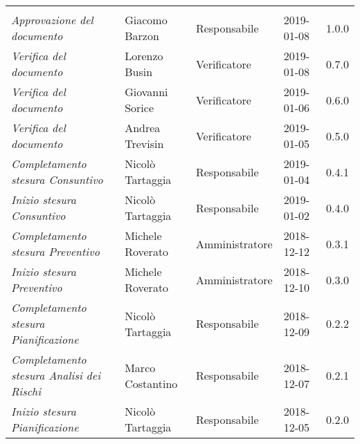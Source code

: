 \newpage 
\section*{}
\begin{table}[H]
	\centering
	\begin{tabular}{p{4cm}|C{3cm}|C{3cm}|R{2.5cm}|R{2cm}}
		
		 & & & & \\
		
		
		\emph{Approvazione del documento} & Giacomo Barzon & Responsabile & 2019-01-08 & 1.0.0 \\
		\hline
		
		\emph{Verifica del documento} & Lorenzo Busin & Verificatore & 2019-01-08 & 0.7.0 \\
		\hline
		
		\emph{Verifica del documento} & Giovanni Sorice & Verificatore & 2019-01-06 & 0.6.0 \\
		\hline
		
		\emph{Verifica del documento} & Andrea Trevisin & Verificatore & 2019-01-05 & 0.5.0 \\
		\hline
		
		\emph{Completamento stesura Consuntivo} & Nicolò Tartaggia & Responsabile & 2019-01-04 & 0.4.1 \\
		\hline
		
		\emph{Inizio stesura Consuntivo} & Nicolò Tartaggia & Responsabile & 2019-01-02 & 0.4.0 \\
		\hline
		
		\emph{Completamento stesura Preventivo} & Michele Roverato & Amministratore & 2018-12-12 & 0.3.1 \\
		\hline
		
		\emph{Inizio stesura Preventivo} & Michele Roverato & Amministratore & 2018-12-10 & 0.3.0 \\
		\hline
		
		\emph{Completamento stesura Pianificazione} & Nicolò Tartaggia & Responsabile & 2018-12-09 & 0.2.2 \\
		\hline
		
		\emph{Completamento stesura Analisi dei Rischi} & Marco Costantino & Responsabile & 2018-12-07 & 0.2.1 \\
		\hline
		
		\emph{Inizio stesura Pianificazione} & Nicolò Tartaggia & Responsabile & 2018-12-05 & 0.2.0 \\
		\hline
		

\end{tabular}
\end{table}
